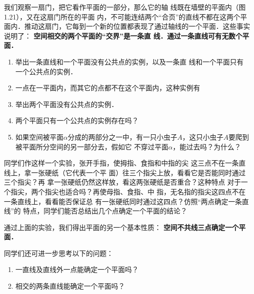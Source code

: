 我们观察一扇门，把它看作平面的一部分，那么它的轴
线既在墙壁的平面内（图1.21），又在这扇门所在的平面
内，不可能连结两个“合页”的直线不都在这两个平面内．推动这扇门，它每到一个新的位置都表现了通过轴线的一个平面．这些事实说明了：
\textbf{空间相交的两个平面的“交界”是一条直
线．通过一条直线可有无数个平面．}

\begin{ex}
\begin{enumerate}
	\item 举出一条直线和一个平面没有公共点的实例，以及一条直
	线和一个平面只有一个公共点的实例．
	\item 一点在一平面内，而其它的点都不在这个平面内，这种实例有\item 举出两个平面没有公共点的实例．
	\item 两个平面只有一个公共点的实例存在吗？
	\item 如果空间被平面$\alpha$分成的两部分之一中，有一只小虫子$A$，这只小虫子$A$要爬到	被平面所分空间的另一部分去，假如它
	不穿过平面$\alpha$，能过去吗？为什么？
\begin{center}
	\begin{tikzpicture}
		
	\end{tikzpicture}
\end{center}
\end{enumerate}
\end{ex}

同学们作这样一个实验，张开手指，使拇指、食指和中指的尖
这三点不在一条直线上，拿一张硬纸（它代表一个平
面）往三个指尖上放，看看它是否能同时通过三个指尖？再
拿一张硬纸仍然这样放，看这两张硬纸是否重合？这种特点
对于一个指尖，两个指尖也适合吗？再使母指、食指、中
指，无名指的指尖这四点不在一条直线上，看看能否保证总
有一张硬纸同时通过这四点？仿照“两点确定一条直线”的
特点，同学们能否总结出几个点确定一个平面的结论？

通过上面的实验，我们得出平面的另一个基本性质：
\textbf{空间不共线三点确定一个平面．}

同学们还可进一步思考以下的问题：
\begin{enumerate}
	\item 一直线及直线外一点能确定一个平面吗？
	\item 相交的两条直线能确定一个平面吗？
\end{enumerate}

